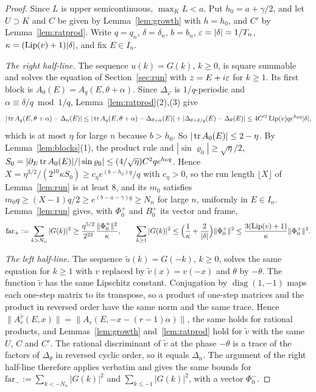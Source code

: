 \begin{proof}
Since $L$ is upper semicontinuous, $\max_KL<a$. Put $h_0=a+\gamma/2$, and let $U\supset K$ and $C$ be given by Lemma~\ref{lem:growth} with $h=h_0$, and $C'$ by Lemma~\ref{lem:ratprod}. Write $q=q_n$, $\delta=\delta_n$, $b=b_n$, $\varepsilon=|\delta|=1/T_n$, $\kappa=(\operatorname{Lip}(v)+1)|\delta|$, and fix $E\in I_n$.

\emph{The right half-line.} The sequence $u(k)=G(k)$, $k\ge0$, is square summable and solves the equation of Section~\ref{sec:run} with $z=E+i\varepsilon$ for $k\ge1$. Its first block is $A_0(E)=A_q(E,\theta+\alpha)$. Since $\Delta_\varphi$ is $1/q$-periodic and $\alpha\equiv\delta/q\bmod 1/q$, Lemma~\ref{lem:ratprod}(2),(3) give
\[
|\operatorname{tr} A_q(E,\theta+\alpha)-\Delta_n(E)|\le|\operatorname{tr} A_q(E,\theta+\alpha)-\Delta_{\theta+\alpha}(E)|+|\Delta_{\theta+\delta/q}(E)-\Delta_\theta(E)|\le4C'^2\operatorname{Lip}(v)qe^{h_0q}|\delta|,
\]
which is at most $\eta$ for large $n$ because $b>h_0$. So $|\operatorname{tr} A_0(E)|\le2-\eta$. By Lemma~\ref{lem:blocks}(1), the product rule and $|\sin\varrho_0|\ge\sqrt\eta/2$, $S_0=|\partial_E\operatorname{tr} A_0(E)|/|\sin\varrho_0|\le(4/\sqrt\eta)C^2qe^{h_0q}$. Hence $X=\eta^{3/2}/(2^{10}\kappa S_0)\ge c_\eta e^{(b-h_0)q}/q$ with $c_\eta>0$, so the run length $\lfloor X\rfloor$ of Lemma~\ref{lem:run} is at least $8$, and its $m_0$ satisfies $m_0q\ge(X-1)q/2\ge e^{(b-a-\gamma)q}\ge N_n$ for large $n$, uniformly in $E\in I_n$. Lemma~\ref{lem:run} gives, with $\Phi^+_0$ and $B^+_0$ its vector and frame,
\[
\mathrm{far}_+:=\sum_{k>N_n}|G(k)|^2\ge\frac{\eta^{5/2}}{2^{22}}\frac{\|\Phi^+_0\|^2}{\kappa},\qquad\sum_{k\ge1}|G(k)|^2\le\Bigl(\frac1\kappa+\frac2{|\delta|}\Bigr)\|\Phi^+_0\|^2\le\frac{3(\operatorname{Lip}(v)+1)}{\kappa}\|\Phi^+_0\|^2 .
\]

\emph{The left half-line.} The sequence $\tilde u(k)=G(-k)$, $k\ge0$, solves the same equation for $k\ge1$ with $v$ replaced by $\tilde v(x)=v(-x)$ and $\theta$ by $-\theta$. The function $\tilde v$ has the same Lipschitz constant. Conjugation by $\operatorname{diag}(1,-1)$ maps each one-step matrix to its transpose, so a product of one-step matrices and the product in reversed order have the same norm and the same trace. Hence $\|A^{\tilde v}_r(E,x)\|=\|A_r(E,-x-(r-1)\alpha)\|$, the same holds for rational products, and Lemmas~\ref{lem:growth} and~\ref{lem:ratprod} hold for $\tilde v$ with the same $U$, $C$ and $C'$. The rational discriminant of $\tilde v$ at the phase $-\theta$ is a trace of the factors of $\Delta_\theta$ in reversed cyclic order, so it equals $\Delta_n$. The argument of the right half-line therefore applies verbatim and gives the same bounds for $\mathrm{far}_-:=\sum_{k<-N_n}|G(k)|^2$ and $\sum_{k\le-1}|G(k)|^2$, with a vector $\Phi^-_0$.


\end{proof}
